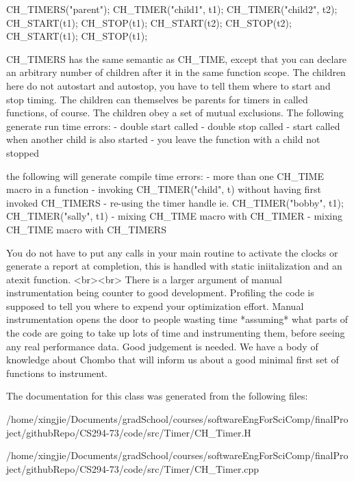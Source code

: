 \begin{DoxyCode}
CH\_TIMERS(\textcolor{stringliteral}{"parent"});
CH\_TIMER(\textcolor{stringliteral}{"child1"}, t1);
CH\_TIMER(\textcolor{stringliteral}{"child2"}, t2);
CH\_START(t1);
CH\_STOP(t1);
CH\_START(t2);
CH\_STOP(t2);
CH\_START(t1);
CH\_STOP(t1);
\end{DoxyCode}
 \begin{DoxyVerb} CH_TIMERS has the same semantic as CH_TIME, except that you can declare an
 arbitrary number of children after it in the same function scope.  The
 children here do not autostart and autostop, you have to tell them where to
 start and stop timing.  The children can themselves be parents for timers
 in called functions, of course. The children obey a set of mutual exclusions. The
 following generate run time errors:
 - double start called
 - double stop called
 - start called when another child is also started
 - you leave the function with a child not stopped

 the following will generate compile time errors:
 - more than one CH_TIME macro in a function
 - invoking CH_TIMER("child", t) without having first invoked CH_TIMERS
 - re-using the timer handle ie. CH_TIMER("bobby", t1); CH_TIMER("sally", t1)
 - mixing CH_TIME macro with CH_TIMER
 - mixing CH_TIME macro with CH_TIMERS

 You do not have to put any calls in your main routine to activate the clocks
 or generate a report at completion, this is handled with static iniitalization
 and an atexit function.
 <br><br>
 There is a larger argument of manual instrumentation being counter to good development.
 Profiling the code is supposed to tell you where to expend your optimization effort.
 Manual instrumentation opens the door to people wasting time *assuming* what parts of the
 code are going to take up lots of time and instrumenting them, before seeing any real
 performance data.  Good judgement is needed.  We have a body of knowledge about Chombo
 that will inform us about a good minimal first set of functions to instrument.\end{DoxyVerb}
 

The documentation for this class was generated from the following files\+:\begin{DoxyCompactItemize}
\item 
/home/xingjie/\+Documents/grad\+School/courses/software\+Eng\+For\+Sci\+Comp/final\+Project/github\+Repo/\+C\+S294-\/73/code/src/\+Timer/C\+H\+\_\+\+Timer.\+H\item 
/home/xingjie/\+Documents/grad\+School/courses/software\+Eng\+For\+Sci\+Comp/final\+Project/github\+Repo/\+C\+S294-\/73/code/src/\+Timer/C\+H\+\_\+\+Timer.\+cpp\end{DoxyCompactItemize}
